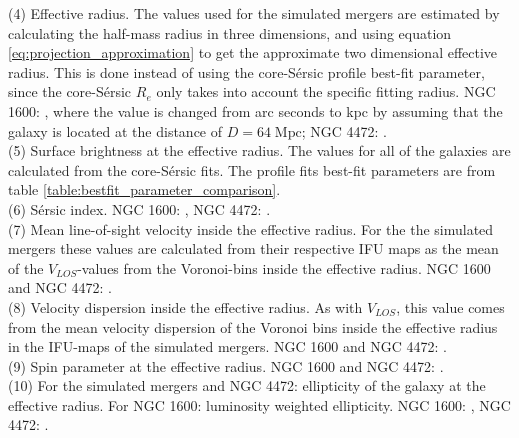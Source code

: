\documentclass[english, oneside]{HYgradu}
\begin{document}
\begin{table}
{	(4) Effective radius. The values used for the simulated mergers are estimated by calculating the half-mass radius in three dimensions, and using equation \ref{eq:projection_approximation} to get the approximate two dimensional effective radius. This is done instead of using the core-Sérsic profile best-fit parameter, since the core-Sérsic $R_e$ only takes into account the specific fitting radius. NGC 1600: \cite{Thomas2016}, where the value is changed from arc seconds to kpc by assuming that the galaxy is located at the distance of $D = 64 \; \mathrm{Mpc}$; NGC 4472: \cite{Veale2017veldisp}. \\
	(5) Surface brightness at the effective radius. The values for all of the galaxies are calculated from the core-Sérsic fits. The profile fits best-fit parameters are from table \ref{table:bestfit_parameter_comparison}. \\
	(6) Sérsic index. NGC 1600: \cite{Thomas2016}, NGC 4472: \cite{Rusli2013}. \\
	(7) Mean line-of-sight velocity inside the effective radius. For the the simulated mergers these values are calculated from their respective IFU maps as the mean of the $V_{LOS}$-values from the Voronoi-bins inside the effective radius. NGC 1600 and NGC 4472: \cite{Bender1994}. \\
	(8) Velocity dispersion inside the effective radius. As with $V_{LOS}$, this value comes from the mean velocity dispersion of the Voronoi bins inside the effective radius in the IFU-maps of the simulated mergers. NGC 1600 and NGC 4472: \cite{Veale2017veldisp}.\\
	(9) Spin parameter at the effective radius. NGC 1600 and NGC 4472: \citep{Veale2018lambda}. \\
	(10) For the simulated mergers and NGC 4472: ellipticity of the galaxy at the effective radius. For NGC 1600: luminosity weighted ellipticity. NGC 1600: \cite{Goullaud2018}, NGC 4472: \cite{Emsellem2011}.
	}
	\label{table:snap6_vs_NGC1600}
\end{table}
\end{document}
